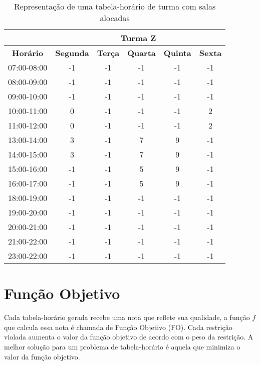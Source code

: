\begin{table}
\centering
\begin{tabular}{|c|c|c|c|c|c|}
\hline
\textbf{} & \multicolumn{5}{c|}{\textbf{Turma Z}} \\ \hline
\textbf{Horário} & \textbf{Segunda} & \textbf{Terça} & \textbf{Quarta} & \textbf{Quinta} & \textbf{Sexta} \\ \hline
07:00-08:00 & -1  & -1  & -1  & -1  & -1  \\ \hline
08:00-09:00 & -1  & -1  & -1  & -1  & -1  \\ \hline
09:00-10:00 & -1  & -1  & -1  & -1  & -1  \\ \hline
10:00-11:00 &  \cellcolor[HTML]{C0C0C0}0  & -1  & -1  & -1  &  \cellcolor[HTML]{C0C0C0}2  \\ \hline
11:00-12:00 &  \cellcolor[HTML]{C0C0C0}0  & -1  & -1  & -1  &  \cellcolor[HTML]{C0C0C0}2  \\ \hline
13:00-14:00 &  \cellcolor[HTML]{C0C0C0}3  & -1  &  \cellcolor[HTML]{C0C0C0}7  &  \cellcolor[HTML]{C0C0C0}9  & -1  \\ \hline
14:00-15:00 &  \cellcolor[HTML]{C0C0C0}3  & -1  &  \cellcolor[HTML]{C0C0C0}7  &  \cellcolor[HTML]{C0C0C0}9  & -1  \\ \hline
15:00-16:00 & -1  & -1  &  \cellcolor[HTML]{C0C0C0}5  &  \cellcolor[HTML]{C0C0C0}9  & -1  \\ \hline
16:00-17:00 & -1  & -1  &  \cellcolor[HTML]{C0C0C0}5  &  \cellcolor[HTML]{C0C0C0}9  & -1  \\ \hline
18:00-19:00 & -1  & -1  & -1  & -1  & -1  \\ \hline
19:00-20:00 & -1  & -1  & -1  & -1  & -1  \\ \hline
20:00-21:00 & -1  & -1  & -1  & -1  & -1  \\ \hline
21:00-22:00 & -1  & -1  & -1  & -1  & -1  \\ \hline
23:00-22:00 & -1  & -1  & -1  & -1  & -1  \\ \hline
\end{tabular}
\caption{Representação de uma tabela-horário de turma com salas alocadas}
\label{tbl_alocadas}
\end{table}

\section{Função Objetivo}
\label{sec-met-fo}

Cada tabela-horário gerada recebe uma nota que reflete sua qualidade, a função \(f\) que calcula essa nota é chamada de Função Objetivo (FO). Cada restrição violada aumenta o valor da função objetivo de acordo com o peso da restrição. A melhor solução para um problema de tabela-horário é aquela que minimiza o valor da função objetivo.

